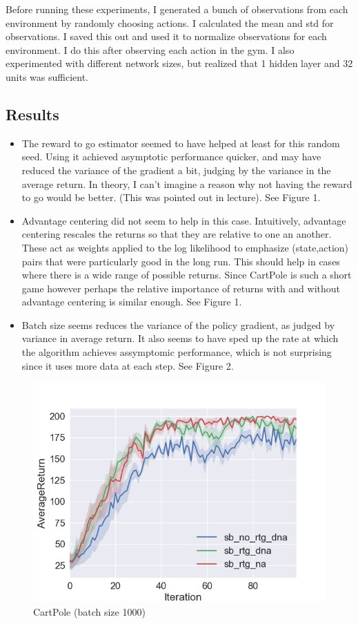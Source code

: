 \documentclass{article}\usepackage[]{graphicx}\usepackage[]{color}
\begin{document}
\noindent Before running these experiments, I generated a bunch of observations from each environment by randomly choosing actions. I calculated the mean and std for observations. I saved this out and used it to normalize observations for each environment. I do this after observing each action in the gym. I also experimented with different network sizes, but realized that 1 hidden layer and 32 units was sufficient. 

\subsection*{Results}

\begin{itemize}
 \item The reward to go estimator seemed to have helped at least for this random seed. Using it achieved asymptotic performance quicker, and may have reduced the variance of the gradient a bit, judging by the variance in the average return. In theory, I can't imagine a reason why not having the reward to go would be better. (This was pointed out in lecture). See Figure 1. 
 \item Advantage centering did not seem to help in this case. Intuitively, advantage centering rescales the returns so that they are relative to one an another. These act as weights applied to the log likelihood to emphasize (state,action) pairs that were particularly good in the long run. This should help in cases where there is a wide range of possible returns. Since CartPole is such a short game however perhaps the relative importance of returns with and without advantage centering is similar enough. See Figure 1.
 \item Batch size seems reduces the variance of the policy gradient, as judged by variance in average return. It also seems to have sped up the rate at which the algorithm achieves assymptomic performance, which is not surprising since it uses more data at each step. See Figure 2. 
 \end{itemize}


\begin{figure}
  \includegraphics[width=\linewidth]{figures/sb_experiments_4.png}
  \caption{CartPole (batch size 1000)}
  \label{sb comparisons}
\end{figure}
\end{document}
